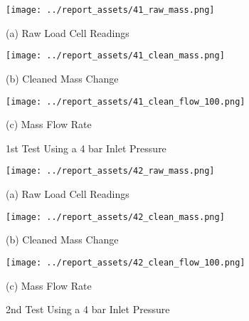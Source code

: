 \begin{figure}[htbp]
    \centering

    \begin{minipage}{0.32\textwidth}
        \centering
        \texttt{[image: ../report\_assets/41\_raw\_mass.png]}
        \caption*{(a) Raw Load Cell Readings}
    \end{minipage}
    \hfill
    \begin{minipage}{0.32\textwidth}
        \centering
        \texttt{[image: ../report\_assets/41\_clean\_mass.png]}
        \caption*{(b) Cleaned Mass Change}
    \end{minipage}
    \hfill
    \begin{minipage}{0.32\textwidth}
        \centering
        \texttt{[image: ../report\_assets/41\_clean\_flow\_100.png]}
        \caption*{(c) Mass Flow Rate}
    \end{minipage}
    \caption{1st Test Using a 4 bar Inlet Pressure}

\end{figure}\label{fig:41}
\vfill
\begin{figure}[htbp]
    \centering

    \begin{minipage}{0.32\textwidth}
        \centering
        \texttt{[image: ../report\_assets/42\_raw\_mass.png]}
        \caption*{(a) Raw Load Cell Readings}
    \end{minipage}
    \hfill
    \begin{minipage}{0.32\textwidth}
        \centering
        \texttt{[image: ../report\_assets/42\_clean\_mass.png]}
        \caption*{(b) Cleaned Mass Change}
    \end{minipage}
    \hfill
    \begin{minipage}{0.32\textwidth}
        \centering
        \texttt{[image: ../report\_assets/42\_clean\_flow\_100.png]}
        \caption*{(c) Mass Flow Rate}
    \end{minipage}
    \caption{2nd Test Using a 4 bar Inlet Pressure}
    
\end{figure}\label{fig:42}
\vfill
